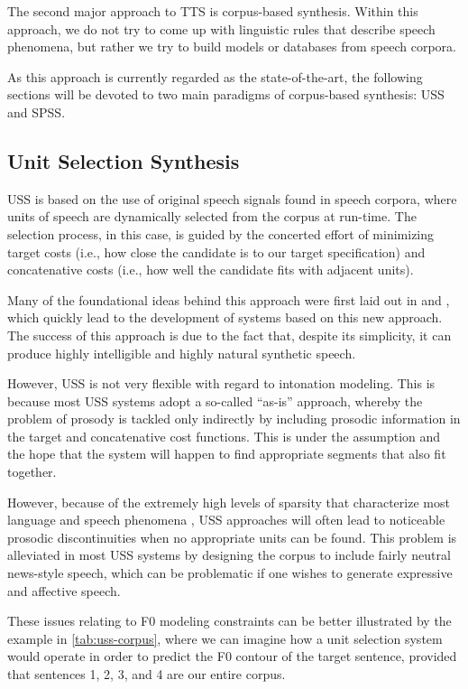 The second major approach to \ac{TTS} is corpus-based synthesis.
Within this approach, we do not try to come up with linguistic rules that describe speech phenomena, but rather we try to build models or databases from speech corpora.

As this approach is currently regarded as the state-of-the-art, the following sections will be devoted to two main paradigms of corpus-based synthesis: \ac{USS} and \ac{SPSS}.

\subsection{Unit Selection Synthesis}

\ac{USS} is based on the use of original speech signals found in speech corpora, where units of speech are dynamically selected from the corpus at run-time.
The selection process, in this case, is guided by the concerted effort of minimizing target costs (i.e., how close the candidate is to our target specification) and concatenative costs (i.e., how well the candidate fits with adjacent units).

Many of the foundational ideas behind this approach were first laid out in \citet
{Hunt1996Unit} and \citet{Campbell1997Prosody}, which quickly lead to the development of systems based on this new approach.
The success of this approach is due to the fact that, despite its simplicity, it can produce highly intelligible and highly natural synthetic speech.

However, \ac{USS} is not very flexible with regard to intonation modeling.
This is because most \ac{USS} systems adopt a so-called ``as-is'' approach, whereby the problem of prosody is tackled only indirectly by including prosodic information in the target and concatenative cost functions.
This is under the assumption and the hope that the system will happen to find appropriate segments that also fit together.

However, because of the extremely high levels of sparsity that characterize most language and speech phenomena \citep{Santen1997Combinatorial, Moebius2003Rare}, \ac{USS} approaches will often lead to noticeable prosodic discontinuities when no appropriate units can be found.
This problem is alleviated in most \ac{USS} systems by designing the corpus to include fairly neutral news-style speech, which can be problematic if one wishes to generate expressive and affective speech.

These issues relating to \ac{F0} modeling constraints can be better illustrated by the example in \autoref{tab:uss-corpus}, where we can imagine how a unit selection system would operate in order to predict the \ac{F0} contour of the target sentence, provided that sentences 1, 2, 3, and 4 are our entire corpus. 

